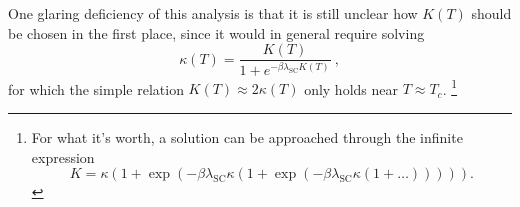 One glaring deficiency of this analysis is that it is still unclear how $ K(T) $ should be chosen in the first place, since it would in general require solving
\begin{equation}
\kappa(T) = \frac{K(T)}{1 + e^{- \beta \lambda_{\text{SC}} K(T)}} ~ ,
\label{eq:kappa_temp}
\end{equation}
for which the simple relation $ K(T) \approx 2 \kappa(T) $ only holds near $ T \approx T_c $. \footnote{For what it's worth, a solution can be approached through the infinite expression
\begin{equation}
K = \kappa  \left( 1 + \exp{\left( - \beta \lambda_{\text{SC}} \kappa \left( 1 + \exp{\left( - \beta \lambda_{\text{SC}} \kappa \left( 1 + \ldots \right) \right)} \right) \right)} \right).
\end{equation}}

